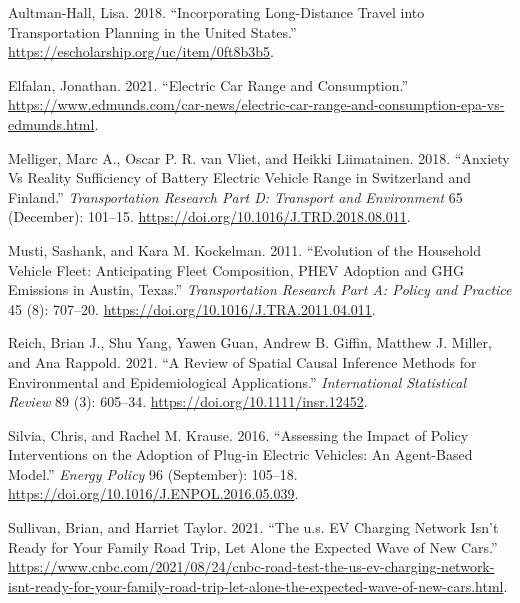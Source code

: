 \documentclass[
  letterpaper,
  DIV=11,
  numbers=noendperiod]{scrartcl}
\newlength{\cslhangindent}
\newlength{\cslentryspacingunit} %
\newenvironment{CSLReferences}[2] %
 {%
  \setlength{\parindent}{0pt}
  \ifodd #1
  \let\oldpar\par
  \def\par{\hangindent=\cslhangindent\oldpar}
  \fi
  \setlength{\parskip}{#2\cslentryspacingunit}
 }%
 {}
\begin{document}
\hypertarget{refs}{}
\begin{CSLReferences}{1}{0}
\leavevmode{}%
Aultman-Hall, Lisa. 2018. {``Incorporating Long-Distance Travel into
Transportation Planning in the United States.''}
\url{https://escholarship.org/uc/item/0ft8b3b5}.

\leavevmode{}%
Elfalan, Jonathan. 2021. {``Electric Car Range and Consumption.''}
\url{https://www.edmunds.com/car-news/electric-car-range-and-consumption-epa-vs-edmunds.html}.

\leavevmode{}%
Melliger, Marc A., Oscar P. R. van Vliet, and Heikki Liimatainen. 2018.
{``Anxiety Vs Reality {\textendash} Sufficiency of Battery Electric
Vehicle Range in Switzerland and Finland.''} \emph{Transportation
Research Part D: Transport and Environment} 65 (December): 101--15.
\url{https://doi.org/10.1016/J.TRD.2018.08.011}.

\leavevmode{}%
Musti, Sashank, and Kara M. Kockelman. 2011. {``Evolution of the
Household Vehicle Fleet: Anticipating Fleet Composition, PHEV Adoption
and GHG Emissions in Austin, Texas.''} \emph{Transportation Research
Part A: Policy and Practice} 45 (8): 707--20.
\url{https://doi.org/10.1016/J.TRA.2011.04.011}.

\leavevmode{}%
Reich, Brian J., Shu Yang, Yawen Guan, Andrew B. Giffin, Matthew J.
Miller, and Ana Rappold. 2021. {``A Review of Spatial Causal Inference
Methods for Environmental and Epidemiological Applications.''}
\emph{International Statistical Review} 89 (3): 605--34.
\url{https://doi.org/10.1111/insr.12452}.

\leavevmode{}%
Silvia, Chris, and Rachel M. Krause. 2016. {``Assessing the Impact of
Policy Interventions on the Adoption of Plug-in Electric Vehicles: An
Agent-Based Model.''} \emph{Energy Policy} 96 (September): 105--18.
\url{https://doi.org/10.1016/J.ENPOL.2016.05.039}.

\leavevmode{}%
Sullivan, Brian, and Harriet Taylor. 2021. {``The u.s. EV Charging
Network Isn't Ready for Your Family Road Trip, Let Alone the Expected
Wave of New Cars.''}
\url{https://www.cnbc.com/2021/08/24/cnbc-road-test-the-us-ev-charging-network-isnt-ready-for-your-family-road-trip-let-alone-the-expected-wave-of-new-cars.html}.


\end{CSLReferences}
\end{document}
